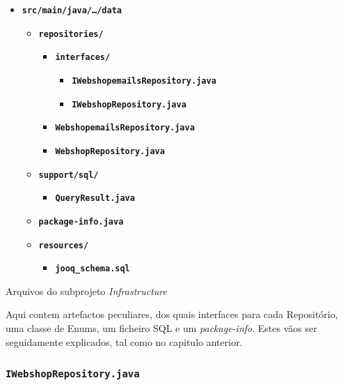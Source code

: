 \begin{table}[!htb]
\begin{itemize}
  \item \texttt{\textbf{src/main/java/\ldots/data}}\begin{itemize}
          \item \texttt{\textbf{repositories/}}\begin{itemize}
                  \item \texttt{\textbf{interfaces/}}\begin{itemize}
                          \item \texttt{\textbf{IWebshopemailsRepository.java}}
                          \item \texttt{\textbf{IWebshopRepository.java}}
                        \end{itemize}
                  \item \texttt{\textbf{WebshopemailsRepository.java}}
                  \item \texttt{\textbf{WebshopRepository.java}}
                \end{itemize}
          \item \texttt{\textbf{support/sql/}}\begin{itemize}
                  \item \texttt{\textbf{QueryResult.java}}
                \end{itemize}
          \item \texttt{\textbf{package-info.java}}
          \item \texttt{\textbf{resources/}}\begin{itemize}
                  \item \texttt{\textbf{jooq\_schema.sql}}
                \end{itemize}
        \end{itemize}
\end{itemize}
\label{tab:infra}
\caption{Arquivos do subprojeto \textit{Infrastructure}}
\end{table}
\FloatBarrier

Aqui contem artefactos peculiares, dos quais interfaces para cada Repositório, uma classe de Enums, um ficheiro SQL e um \textit{package-info}. Estes vãos ser seguidamente explicados, tal como no capitulo anterior.

\newpage

\subsubsection*{\texttt{IWebshopRepository.java}}

